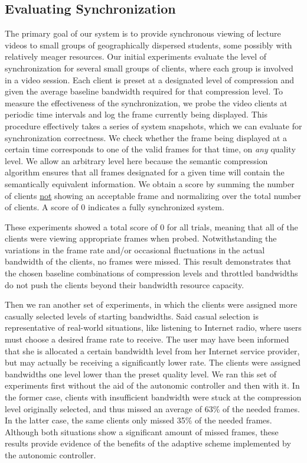\documentclass{sig-alternate}
\begin{document}
\subsection{Evaluating Synchronization}
The primary goal of our system is to provide synchronous viewing of
lecture videos to small groups of geographically dispersed students,
some possibly with relatively meager resources.  Our initial
experiments evaluate the level of synchronization for several small
groups of clients, where each group is involved in a video session.
Each client is preset at a designated level of compression and given
the average baseline bandwidth required for that compression level.
To measure the effectiveness of the synchronization, we probe the
video clients at periodic time intervals and log the frame currently
being displayed.  This procedure effectively takes a series of system
snapshots, which we can evaluate for synchronization correctness.  We
check whether the frame being displayed at a certain time corresponds
to one of the valid frames for that time, on {\em any} quality level.
We allow an arbitrary level here because the semantic compression
algorithm ensures that all frames designated for a given time will
contain the semantically equivalent information.  We obtain a score by
summing the number of clients \underline{not} showing an acceptable
frame and normalizing over the total number of clients.  A score of 0
indicates a fully synchronized system.

These experiments showed a total score of 0 for all trials, meaning
that all of the clients were viewing appropriate frames when probed.
Notwithstanding the variations in the frame rate and/or occasional
fluctuations in the actual bandwidth of the clients, no frames were
missed.  This result demonstrates that the chosen baseline
combinations of compression levels and throttled bandwidths do not
push the clients beyond their bandwidth resource capacity.

Then we ran another set of experiments, in which the clients were
assigned more casually selected levels of starting bandwidths.  Said
casual selection is representative of real-world situations, like
listening to Internet radio, where users must choose a desired frame
rate to receive.  The user may have been informed that she is
allocated a certain bandwidth level from her Internet service
provider, but may actually be receiving a significantly lower rate.
The clients were assigned bandwidths one level lower than the preset
quality level.  We ran this set of experiments first without the aid
of the autonomic controller and then with it. In the former case,
clients with insufficient bandwidth were stuck at the compression
level originally selected, and thus missed an average of 63\% of the
needed frames.  In the latter case, the same clients only missed 35\%
of the needed frames.  Although both situations show a significant
amount of missed frames, these results provide evidence of the
benefits of the adaptive scheme implemented by the autonomic
controller.
\end{document}
